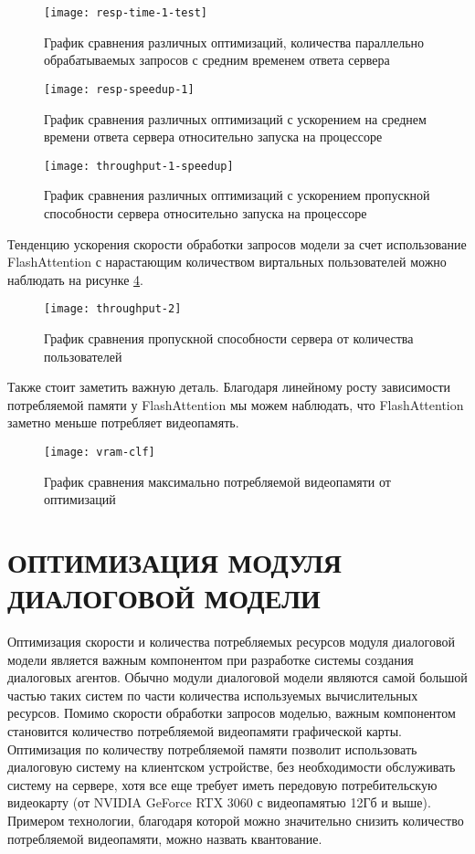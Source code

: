 \begin{figure}[H]
    \centering
    \texttt{[image: resp-time-1-test]}
    \caption{График сравнения различных оптимизаций, количества параллельно обрабатываемых запросов с средним временем ответа сервера}
    \label{resp-time-1}
\end{figure}

\begin{figure}[H]
    \centering
    \texttt{[image: resp-speedup-1]}
    \caption{ График сравнения различных оптимизаций с ускорением на среднем времени ответа сервера относительно запуска на процессоре}
    \label{resp-time-1-speedup}
\end{figure}

\begin{figure}[H]
    \centering
    \texttt{[image: throughput-1-speedup]}
    \caption{График сравнения различных оптимизаций с ускорением пропускной способности сервера относительно запуска на процессоре}
    \label{throughput-1-speedup}
\end{figure}

Тенденцию ускорения скорости обработки запросов модели за счет использование FlashAttention с нарастающим количеством виртальных пользователей можно наблюдать на рисунке \ref{throughput-2}.

\begin{figure}[H]
    \centering
    \texttt{[image: throughput-2]}
    \caption{График сравнения пропускной способности сервера от количества пользователей}
    \label{throughput-2}
\end{figure}

Также стоит заметить важную деталь. Благодаря линейному росту зависимости потребляемой памяти у FlashAttention мы можем наблюдать, что FlashAttention заметно меньше потребляет видеопамять.

\begin{figure}[H]
    \centering
    \texttt{[image: vram-clf]}
    \caption{График сравнения максимально потребляемой видеопамяти от оптимизаций}
    \label{vram-clf}
\end{figure}

\section{ОПТИМИЗАЦИЯ МОДУЛЯ ДИАЛОГОВОЙ МОДЕЛИ}
Оптимизация скорости и количества потребляемых ресурсов модуля диалоговой модели является важным компонентом при разработке системы создания диалоговых агентов. Обычно модули диалоговой модели являются самой большой частью таких систем по части количества используемых вычислительных ресурсов. Помимо скорости обработки запросов моделью, важным компонентом становится количество потребляемой видеопамяти графической карты. Оптимизация по количеству потребляемой памяти позволит использовать диалоговую систему на клиентском устройстве, без необходимости обслуживать систему на сервере, хотя все еще требует иметь передовую потребительскую видеокарту (от NVIDIA GeForce RTX 3060 с видеопамятью 12Гб и выше). Примером технологии, благодаря которой можно значительно снизить количество потребляемой видеопамяти, можно назвать квантование.


